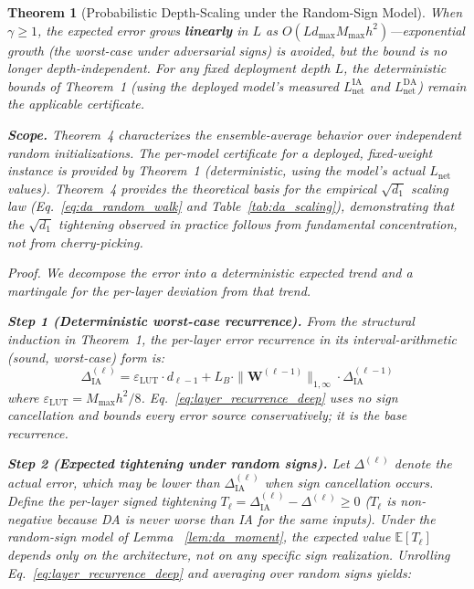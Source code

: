 \documentclass[journal,onecolumn]{IEEEtran}
\newtheorem{theorem}{Theorem}
\begin{document}
\begin{theorem}[Probabilistic Depth-Scaling under the Random-Sign Model]
When $\gamma \geq 1$, the expected error grows \textbf{linearly} in $L$
as $O(L d_{\max} M_{\max} h^2)$---exponential growth (the worst-case
under adversarial signs) is avoided, but the bound is no longer
depth-independent. For any fixed deployment depth $L$, the
deterministic bounds of Theorem~1 (using the deployed model's measured
$L_{\text{net}}^{\text{IA}}$ and $L_{\text{net}}^{\text{DA}}$) remain
the applicable certificate.

\textbf{Scope.} Theorem~4 characterizes the \textit{ensemble-average}
behavior over independent random initializations. The per-model
certificate for a deployed, fixed-weight instance is provided by
Theorem~1 (deterministic, using the model's actual $L_{\text{net}}$
values). Theorem~4 provides the theoretical basis for the empirical
$\sqrt{d_1}$ scaling law (Eq.~\ref{eq:da_random_walk} and
Table~\ref{tab:da_scaling}), demonstrating that the $\sqrt{d_1}$
tightening observed in practice follows from fundamental concentration,
not from cherry-picking.

\vspace{2pt}
\noindent\textit{Proof.}
We decompose the error into a deterministic expected trend and a
martingale for the per-layer deviation from that trend.

\vspace{2pt}
\noindent\textbf{Step 1 (Deterministic worst-case recurrence).}
From the structural induction in Theorem~1, the per-layer error
recurrence in its interval-arithmetic (sound, worst-case) form is:
\begin{equation}
\Delta_{\text{IA}}^{(\ell)} = \varepsilon_{\text{LUT}} \cdot d_{\ell-1}
+ L_B \cdot \|\mathbf{W}^{(\ell-1)}\|_{1,\infty}
\cdot \Delta_{\text{IA}}^{(\ell-1)}
\label{eq:layer_recurrence_deep}
\end{equation}
where $\varepsilon_{\text{LUT}} = M_{\max} h^2 / 8$.
Eq.~\ref{eq:layer_recurrence_deep} uses no sign cancellation and
bounds every error source conservatively; it is the base recurrence.

\vspace{2pt}
\noindent\textbf{Step 2 (Expected tightening under random signs).}
Let $\Delta^{(\ell)}$ denote the \textit{actual} error, which may be
lower than $\Delta_{\text{IA}}^{(\ell)}$ when sign cancellation occurs.
Define the per-layer signed tightening
$T_\ell = \Delta_{\text{IA}}^{(\ell)} - \Delta^{(\ell)} \geq 0$
($T_\ell$ is non-negative because DA is never worse than IA for the
same inputs). Under the random-sign model of Lemma~
\ref{lem:da_moment}, the expected
value $\mathbb{E}[T_\ell]$ depends only on the architecture, not on
any specific sign realization. Unrolling
Eq.~\ref{eq:layer_recurrence_deep} and averaging over random signs
yields:


\end{theorem}
\end{document}
